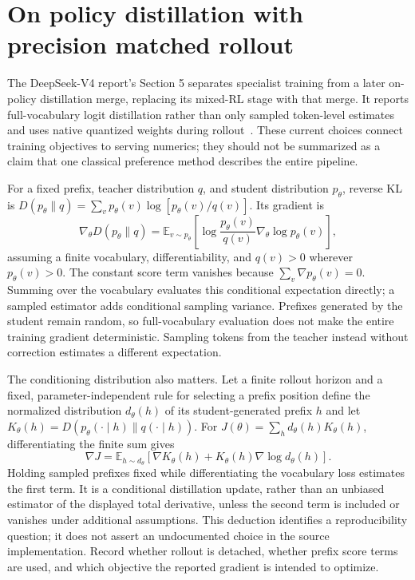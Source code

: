 \section{On policy distillation with precision matched rollout}
\label{sec:C08:frontier}
The DeepSeek-V4 report's Section 5 separates specialist training from a later on-policy distillation merge, replacing its mixed-RL stage with that merge. It reports full-vocabulary logit distillation rather than only sampled token-level estimates and uses native quantized weights during rollout~\cite{rewrite_deepseek4}. These current choices connect training objectives to serving numerics; they should not be summarized as a claim that one classical preference method describes the entire pipeline.

For a fixed prefix, teacher distribution $q$, and student distribution $p_\theta$, reverse KL is $D(p_\theta\|q)=\sum_vp_\theta(v)\log[p_\theta(v)/q(v)]$. Its gradient is
\begin{equation}
 \nabla_\theta D(p_\theta\|q)=
 \mathbb E_{v\sim p_\theta}
 \left[\log\frac{p_\theta(v)}{q(v)}
 \nabla_\theta\log p_\theta(v)\right],
\end{equation}
assuming a finite vocabulary, differentiability, and $q(v)>0$ wherever $p_\theta(v)>0$. The constant score term vanishes because $\sum_v\nabla p_\theta(v)=0$. Summing over the vocabulary evaluates this conditional expectation directly; a sampled estimator adds conditional sampling variance. Prefixes generated by the student remain random, so full-vocabulary evaluation does not make the entire training gradient deterministic. Sampling tokens from the teacher instead without correction estimates a different expectation.

The conditioning distribution also matters. Let a finite rollout horizon and a fixed, parameter-independent rule for selecting a prefix position define the normalized distribution $d_\theta(h)$ of its student-generated prefix $h$ and let $K_\theta(h)=D(p_\theta(\cdot\mid h)\|q(\cdot\mid h))$. For $J(\theta)=\sum_h d_\theta(h)K_\theta(h)$, differentiating the finite sum gives
\begin{equation}
 \nabla J=\mathbb E_{h\sim d_\theta}
 \left[\nabla K_\theta(h)
 +K_\theta(h)\nabla\log d_\theta(h)\right].
\end{equation}
Holding sampled prefixes fixed while differentiating the vocabulary loss estimates the first term. It is a conditional distillation update, rather than an unbiased estimator of the displayed total derivative, unless the second term is included or vanishes under additional assumptions. This deduction identifies a reproducibility question; it does not assert an undocumented choice in the source implementation. Record whether rollout is detached, whether prefix score terms are used, and which objective the reported gradient is intended to optimize.

